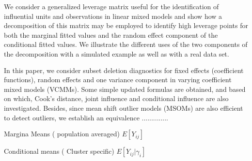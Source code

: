\documentclass[12pt, a4paper]{article}
\begin{document}
\newpage
\begin{framed}
	We consider a generalized leverage matrix useful for the identification of influential units and observations in linear mixed models and show how a decomposition of this matrix may be employed to identify high leverage points for both the marginal fitted values and the random effect component of the conditional fitted values. We illustrate the different uses of the two components of the decomposition with a simulated example as well as with a real data set.\citet{nobresinger}
\end{framed}	
\begin{framed}
In this paper, we consider subset deletion diagnostics for fixed effects (coefficient functions), 
random effects and one variance component in varying coefficient mixed models (VCMMs). 
Some simple updated formulas are obtained, and based on which, Cook's distance, joint 
influence and conditional influence are also investigated. Besides, since mean shift outlier 
models (MSOMs) are also efficient to detect outliers, we establish an equivalence ..............
\citep{li2009influence}

\end{framed}

Margina Means ( population averaged)
$E[Y_{ij}]$

Conditional means ( Cluster specific)
$E[Y_{ij}|\gamma_{i}]$






\end{document}

